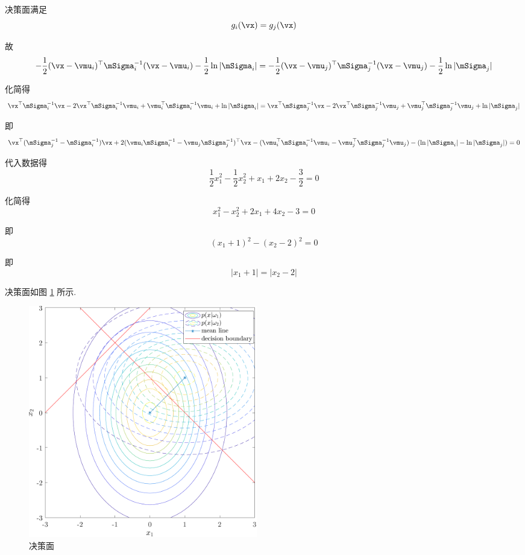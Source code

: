 \documentclass[openany]{ctexbook}
\theoremstyle{kaiti}
\theoremstyle{normal}
\begin{document}
决策面满足
\begin{equation}
  g_i(\vx)=g_j(\vx)
\end{equation}

故
\begin{equation}
  -\frac{1}{2}(\vx-\vmu_i)^{\top}\mSigma_i^{-1}(\vx-\vmu_i)-\frac{1}{2}\ln|\mSigma_i|=-\frac{1}{2}(\vx-\vmu_j)^{\top}\mSigma_j^{-1}(\vx-\vmu_j)-\frac{1}{2}\ln|\mSigma_j|
\end{equation}

化简得
\begin{equation}
  \vx^{\top}\mSigma_i^{-1}\vx-2\vx^{\top}\mSigma_i^{-1}\vmu_i+\vmu_i^{\top}\mSigma_i^{-1}\vmu_i+\ln|\mSigma_i|
  =\vx^{\top}\mSigma_j^{-1}\vx-2\vx^{\top}\mSigma_j^{-1}\vmu_j+\vmu_j^{\top}\mSigma_j^{-1}\vmu_j+\ln|\mSigma_j|
\end{equation}

即
\begin{equation}
  \vx^{\top}(\mSigma_j^{-1}-\mSigma_i^{-1})\vx+2(\vmu_i\mSigma_i^{-1}-\vmu_j\mSigma_j^{-1})^{\top}\vx-(\vmu_i^{\top}\mSigma_i^{-1}\vmu_i-\vmu_j^{\top}\mSigma_j^{-1}\vmu_j)-(\ln|\mSigma_i|-\ln|\mSigma_j|)=0
\end{equation}

代入数据得
\begin{equation}
  \frac{1}{2}x_1^2-\frac{1}{2}x_2^2+x_1+2x_2-\frac{3}{2}=0
\end{equation}

化简得
\begin{equation}
  x_1^2-x_2^2+2x_1+4x_2-3=0
\end{equation}

即
\begin{equation}
  (x_1+1)^2-(x_2-2)^2=0
\end{equation}

即
\begin{equation}
  |x_1+1|=|x_2-2|
\end{equation}

决策面如图 \ref{fig:mvnpdf-4} 所示.

\begin{figure}[t]
  \centering
  \includegraphics[width=10cm]{mvnpdf-4.pdf}
  \caption{决策面}
  \label{fig:mvnpdf-4}
\end{figure}
\end{document}
